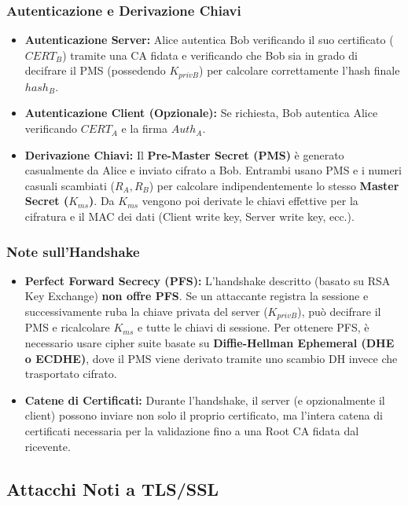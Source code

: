 \documentclass[../main.tex]{subfiles}
\begin{document}
\begin{enumerate}
\subsubsection{Autenticazione e Derivazione Chiavi}
\begin{itemize}
    \item \textbf{Autenticazione Server:} Alice autentica Bob verificando il suo certificato ($CERT_B$) tramite una CA fidata e verificando che Bob sia in grado di decifrare il PMS (possedendo $K_{privB}$) per calcolare correttamente l'hash finale $hash_B$.
    \item \textbf{Autenticazione Client (Opzionale):} Se richiesta, Bob autentica Alice verificando $CERT_A$ e la firma $Auth_A$.
    \item \textbf{Derivazione Chiavi:} Il \textbf{Pre-Master Secret (PMS)} è generato casualmente da Alice e inviato cifrato a Bob. Entrambi usano PMS e i numeri casuali scambiati ($R_A, R_B$) per calcolare indipendentemente lo stesso \textbf{Master Secret ($K_{ms}$)}. Da $K_{ms}$ vengono poi derivate le chiavi effettive per la cifratura e il MAC dei dati (Client write key, Server write key, ecc.).
\end{itemize}

\subsubsection{Note sull'Handshake}
\begin{itemize}
    \item \textbf{Perfect Forward Secrecy (PFS):} L'handshake descritto (basato su RSA Key Exchange) \textbf{non offre PFS}. Se un attaccante registra la sessione e successivamente ruba la chiave privata del server ($K_{privB}$), può decifrare il PMS e ricalcolare $K_{ms}$ e tutte le chiavi di sessione. Per ottenere PFS, è necessario usare cipher suite basate su \textbf{Diffie-Hellman Ephemeral (DHE o ECDHE)}, dove il PMS viene derivato tramite uno scambio DH invece che trasportato cifrato.
    \item \textbf{Catene di Certificati:} Durante l'handshake, il server (e opzionalmente il client) possono inviare non solo il proprio certificato, ma l'intera catena di certificati necessaria per la validazione fino a una Root CA fidata dal ricevente.
\end{itemize}

\subsection{Attacchi Noti a TLS/SSL}


\end{enumerate}
\end{document}
